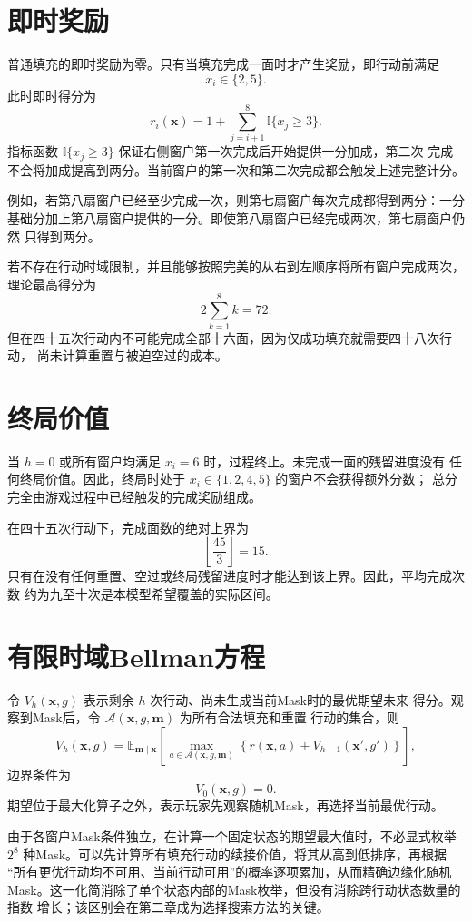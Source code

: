 \documentclass[UTF8,11pt,openany]{ctexrep}
\newcommand{\ind}{\mathbb{I}}
\newcommand{\xvec}{\boldsymbol{x}}
\newcommand{\mvec}{\boldsymbol{m}}
\begin{document}
\section{即时奖励}

普通填充的即时奖励为零。只有当填充完成一面时才产生奖励，即行动前满足
\[
x_i\in\{2,5\}.
\]
此时即时得分为
\[
r_i(\xvec)
=1+\sum_{j=i+1}^{8}\ind\{x_j\ge3\}.
\]
指标函数 $\ind\{x_j\ge3\}$ 保证右侧窗户第一次完成后开始提供一分加成，第二次
完成不会将加成提高到两分。当前窗户的第一次和第二次完成都会触发上述完整计分。

例如，若第八扇窗户已经至少完成一次，则第七扇窗户每次完成都得到两分：一分
基础分加上第八扇窗户提供的一分。即使第八扇窗户已经完成两次，第七扇窗户仍然
只得到两分。

若不存在行动时域限制，并且能够按照完美的从右到左顺序将所有窗户完成两次，
理论最高得分为
\[
2\sum_{k=1}^{8}k=72.
\]
但在四十五次行动内不可能完成全部十六面，因为仅成功填充就需要四十八次行动，
尚未计算重置与被迫空过的成本。

\section{终局价值}

当 $h=0$ 或所有窗户均满足 $x_i=6$ 时，过程终止。未完成一面的残留进度没有
任何终局价值。因此，终局时处于 $x_i\in\{1,2,4,5\}$ 的窗户不会获得额外分数；
总分完全由游戏过程中已经触发的完成奖励组成。

在四十五次行动下，完成面数的绝对上界为
\[
\left\lfloor\frac{45}{3}\right\rfloor=15.
\]
只有在没有任何重置、空过或终局残留进度时才能达到该上界。因此，平均完成次数
约为九至十次是本模型希望覆盖的实际区间。

\section{有限时域Bellman方程}

令 $V_h(\xvec,g)$ 表示剩余 $h$ 次行动、尚未生成当前Mask时的最优期望未来
得分。观察到Mask后，令 $\mathcal{A}(\xvec,g,\mvec)$ 为所有合法填充和重置
行动的集合，则
\[
V_h(\xvec,g)
=\mathbb{E}_{\mvec\mid\xvec}
\left[
\max_{a\in\mathcal{A}(\xvec,g,\mvec)}
\left\{
r(\xvec,a)+V_{h-1}(\xvec',g')
\right\}
\right],
\]
边界条件为
\[
V_0(\xvec,g)=0.
\]
期望位于最大化算子之外，表示玩家先观察随机Mask，再选择当前最优行动。

由于各窗户Mask条件独立，在计算一个固定状态的期望最大值时，不必显式枚举
$2^8$ 种Mask。可以先计算所有填充行动的续接价值，将其从高到低排序，再根据
“所有更优行动均不可用、当前行动可用”的概率逐项累加，从而精确边缘化随机
Mask。这一化简消除了单个状态内部的Mask枚举，但没有消除跨行动状态数量的指数
增长；该区别会在第二章成为选择搜索方法的关键。
\end{document}
